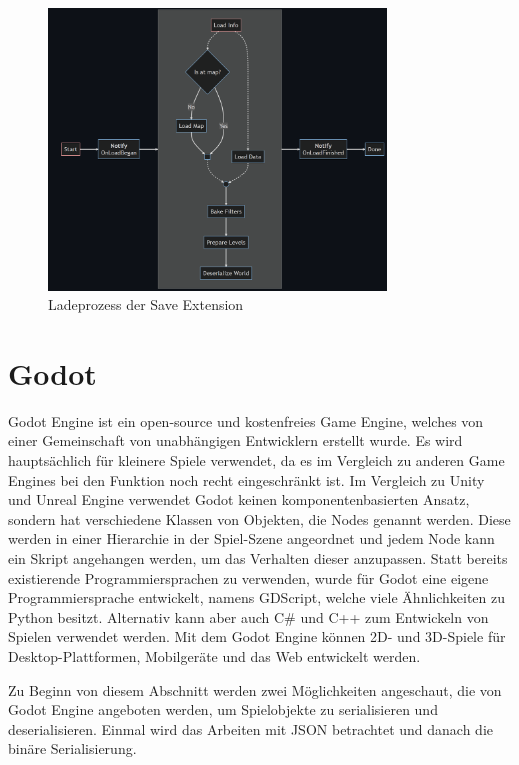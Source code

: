 \begin{figure}[htp]
    \centering
    \includegraphics[width=0.8\textwidth]{images/piperift_load_process.png}
    \caption{Ladeprozess der Save Extension\cite{piperiftLoadProcess}}
    \label{fig:piperiftLoadProcess}
\end{figure}


\section{Godot}
Godot Engine ist ein open-source und kostenfreies Game Engine, welches von einer Gemeinschaft von unabhängigen Entwicklern erstellt wurde. Es wird hauptsächlich für kleinere Spiele verwendet, da es im Vergleich zu anderen Game Engines bei den Funktion noch recht eingeschränkt ist. Im Vergleich zu Unity und Unreal Engine verwendet Godot keinen komponentenbasierten Ansatz, sondern hat verschiedene Klassen von Objekten, die Nodes genannt werden. Diese werden in einer Hierarchie in der Spiel-Szene angeordnet und jedem Node kann ein Skript angehangen werden, um das Verhalten dieser anzupassen. Statt bereits existierende Programmiersprachen zu verwenden, wurde für Godot eine eigene Programmiersprache entwickelt, namens GDScript, welche viele Ähnlichkeiten zu Python besitzt. Alternativ kann aber auch C\# und C++ zum Entwickeln von Spielen verwendet werden. Mit dem Godot Engine können 2D- und 3D-Spiele für Desktop-Plattformen, Mobilgeräte und das Web entwickelt werden.\cite{salmela2022game}

Zu Beginn von diesem Abschnitt werden zwei Möglichkeiten angeschaut, die von Godot Engine angeboten werden, um Spielobjekte zu serialisieren und deserialisieren. Einmal wird das Arbeiten mit JSON betrachtet und danach die binäre Serialisierung. 

